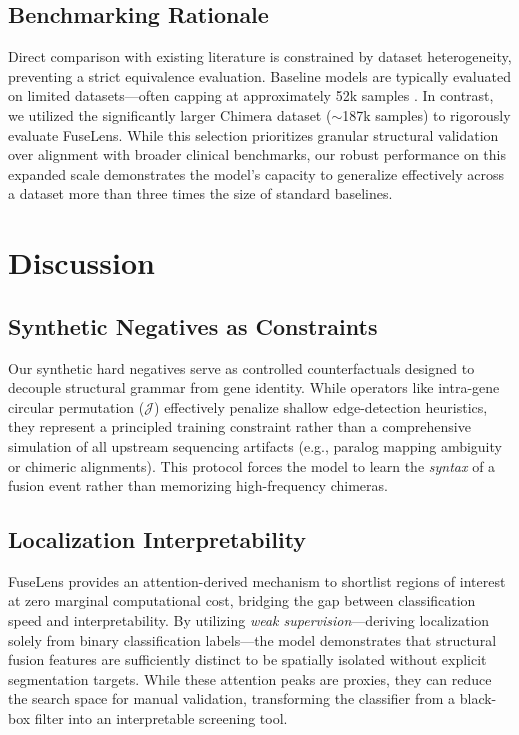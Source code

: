 \documentclass{bioinfo}
\begin{document}
\subsection{Benchmarking Rationale}
Direct comparison with existing literature is constrain\-ed by dataset heterogeneity, preventing a strict equivalence evaluation. Baseline models are typically evaluated on limited datasets—often capping at approximately 52k samples \cite{krupicka2025benchmarking}. In contrast, we utilized the significantly larger Chimera dataset ($\sim$187k samples) to rigorously evaluate FuseLens. While this selection prioritizes granular structural validation over alignment with broader clinical benchmarks, our robust performance on this expanded scale demonstrates the model's capacity to generalize effectively across a dataset more than three times the size of standard baselines.

\section{Discussion}

\subsection{Synthetic Negatives as Constraints}
Our synthetic hard negatives serve as controlled counterfactuals designed to decouple structural grammar from gene identity. While operators like intra-gene circular permutation ($\mathcal{J}$) effectively penalize shallow edge-detection heuristics, they represent a principled training constraint rather than a comprehensive simulation of all upstream sequencing artifacts (e.g., paralog mapping ambiguity or chimeric alignments). This protocol forces the model to learn the \textit{syntax} of a fusion event rather than memorizing high-frequency chimeras.

\subsection{Localization Interpretability}
FuseLens provides an attention-derived mechanism to shortlist regions of interest at zero marginal computational cost, bridging the gap between classification speed and interpretability. By utilizing \textit{weak supervision}—deriving localization solely from binary classification labels—the model demonstrates that structural fusion features are sufficiently distinct to be spatially isolated without explicit segmentation targets. While these attention peaks are proxies, they can reduce the search space for manual validation, transforming the classifier from a black-box filter into an interpretable screening tool.
\end{document}
